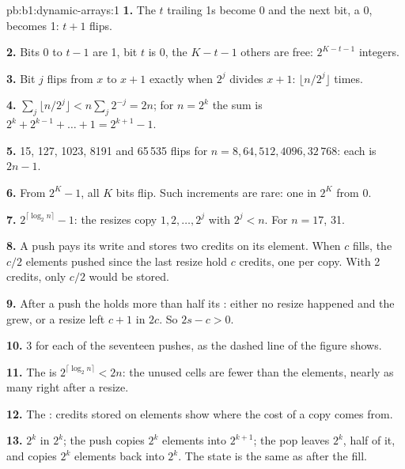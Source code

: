 \begin{solution}{pb:b1:dynamic-arrays:1}
\textbf{1.} The $t$ trailing 1s become 0 and the next bit, a 0, becomes 1: $t + 1$ flips.

\textbf{2.} Bits 0 to $t - 1$ are 1, bit $t$ is 0, the $K - t - 1$ others are free: $2^{K - t - 1}$ integers.

\textbf{3.} Bit $j$ flips from $x$ to $x + 1$ exactly when $2^j$ divides $x + 1$: $\lfloor n/2^j \rfloor$ times.

\textbf{4.} $\sum_j \lfloor n/2^j \rfloor < n \sum_j 2^{-j} = 2n$; for $n = 2^k$ the sum is $2^k + 2^{k-1} + \dots + 1 =
2^{k+1} - 1$.

\textbf{5.} 15, 127, 1023, 8191 and 65\,535 flips for $n = 8, 64, 512, 4096, 32\,768$: each is $2n - 1$.

\textbf{6.} From $2^K - 1$, all $K$ bits flip. Such increments are rare: one in $2^{K}$ from 0.

\textbf{7.} $2^{\lceil \log_2 n \rceil} - 1$: the resizes copy $1, 2, \dots, 2^j$ with $2^j < n$. For $n = 17$, 31.

\textbf{8.} A push pays its write and stores two credits on its element. When  $c$ fills, the $c/2$ elements
pushed since the last resize hold $c$ credits, one per copy. With 2 credits, only $c/2$ would be stored.

\textbf{9.} After a push the  holds more than half its : either no resize happened and the  grew, or a
resize left  $c + 1$ in  $2c$. So $2s - c > 0$.

\textbf{10.} 3 for each of the seventeen pushes, as the dashed line of the figure shows.

\textbf{11.} The  is $2^{\lceil \log_2 n \rceil} < 2n$: the unused cells are fewer than the elements, nearly as
many right after a resize.

\textbf{12.} The : credits stored on elements show where the cost of a copy comes from.

\textbf{13.}  $2^k$ in  $2^k$; the push copies $2^k$ elements into  $2^{k+1}$; the pop leaves 
$2^k$, half of it, and copies $2^k$ elements back into  $2^k$. The state is the same as after the fill.


\end{solution}
